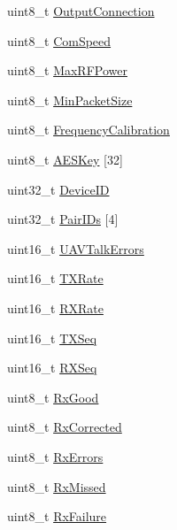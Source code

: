 \begin{DoxyCompactItemize}
\item 
uint8\-\_\-t \hyperlink{struct____attribute_____a091524dfc6db39081b289378d5fc33e8}{\-Output\-Connection}
\item 
uint8\-\_\-t \hyperlink{struct____attribute_____a1e58bb7c476e12fb4e89cb7015368d93}{\-Com\-Speed}
\item 
uint8\-\_\-t \hyperlink{struct____attribute_____aca4f98bce6a41ab6258a04398f2ce0a5}{\-Max\-R\-F\-Power}
\item 
uint8\-\_\-t \hyperlink{struct____attribute_____a5f8cf38b97f0831b9827da7bfd5adfca}{\-Min\-Packet\-Size}
\item 
uint8\-\_\-t \hyperlink{struct____attribute_____a6d623f9f5d5c6938ef4cf34c53ca6215}{\-Frequency\-Calibration}
\item 
uint8\-\_\-t \hyperlink{struct____attribute_____a5ab8430b7b9de7ac3e630ccbce18e705}{\-A\-E\-S\-Key} \mbox{[}32\mbox{]}
\item 
uint32\-\_\-t \hyperlink{struct____attribute_____a03ce6905ffece1c1579deb4364e1e935}{\-Device\-I\-D}
\item 
uint32\-\_\-t \hyperlink{struct____attribute_____a23c4dff2c8f1143f2b8181c46090a308}{\-Pair\-I\-Ds} \mbox{[}4\mbox{]}
\item 
uint16\-\_\-t \hyperlink{struct____attribute_____af14551146af4c6409242afa821832179}{\-U\-A\-V\-Talk\-Errors}
\item 
uint16\-\_\-t \hyperlink{struct____attribute_____ab0bd2d176de1dfdd627fc05f0ab8a4e2}{\-T\-X\-Rate}
\item 
uint16\-\_\-t \hyperlink{struct____attribute_____ad8c311968a754ceb7a6ea35061ba0be2}{\-R\-X\-Rate}
\item 
uint16\-\_\-t \hyperlink{struct____attribute_____aea915d362237fb573eb3f831bad4103c}{\-T\-X\-Seq}
\item 
uint16\-\_\-t \hyperlink{struct____attribute_____ad9013a32efca09c14c12854a620f0d3f}{\-R\-X\-Seq}
\item 
uint8\-\_\-t \hyperlink{struct____attribute_____a04e8cd5b68bbba57eb9ee40986519a30}{\-Rx\-Good}
\item 
uint8\-\_\-t \hyperlink{struct____attribute_____ad11b8311db937b577f6163b8e4e93d66}{\-Rx\-Corrected}
\item 
uint8\-\_\-t \hyperlink{struct____attribute_____a153065bff53d3d6f075f5d6959387a73}{\-Rx\-Errors}
\item 
uint8\-\_\-t \hyperlink{struct____attribute_____a9fdfd5bf8ab50c030f16b328ef266a0b}{\-Rx\-Missed}
\item 
uint8\-\_\-t \hyperlink{struct____attribute_____a22457bdd88cc82d98e9892e2be6af702}{\-Rx\-Failure}

\end{DoxyCompactItemize}
